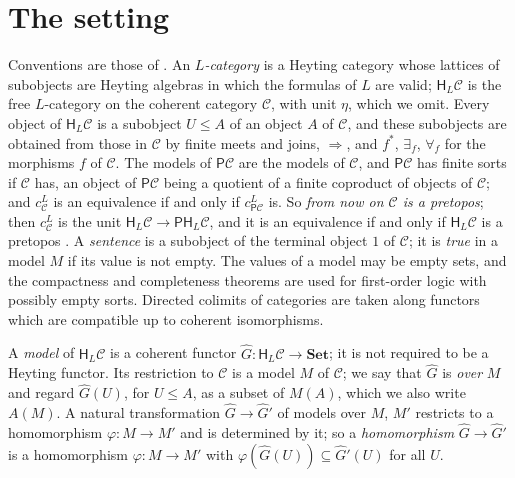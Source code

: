 \documentclass[11pt]{amsart}
\theoremstyle{definition}
\newcommand{\Set}{\mathbf{Set}}
\newcommand{\PP}{\mathsf P}
\newcommand{\HH}{\mathsf H}
\newcommand{\cC}{\mathcal C}
\begin{document}
\section{The setting}\label{sec:setting}

Conventions are those of \cite{Interm}. An \emph{$L$-category} is a
Heyting category whose lattices of subobjects are Heyting algebras in
which the formulas of $L$ are valid; $\HH_L\cC$ is the free
$L$-category on the coherent category $\cC$, with unit $\eta$, which
we omit. Every object of $\HH_L\cC$ is a subobject $U\le A$ of an
object $A$ of $\cC$, and these subobjects are obtained from those in
$\cC$ by finite meets and joins, $\Rightarrow$, and $f^*$, $\exists_f$,
$\forall_f$ for the morphisms $f$ of $\cC$. The models of $\PP\cC$ are
the models of $\cC$, and $\PP\cC$ has finite sorts if $\cC$ has, an
object of $\PP\cC$ being a quotient of a finite coproduct of objects
of $\cC$; and $c^L_\cC$ is an equivalence if and only if $c^L_{\PP\cC}$
is. So \emph{from now on $\cC$ is a pretopos}; then $c^L_\cC$ is the
unit $\HH_L\cC\to\PP\HH_L\cC$, and it is an equivalence if and only if
$\HH_L\cC$ is a pretopos \cite[Lemma~2.2]{Interm}. A \emph{sentence}
is a subobject of the terminal object $1$ of $\cC$; it is \emph{true}
in a model $M$ if its value is not empty. The values of a model may be
empty sets, and the compactness and completeness theorems are used for
first-order logic with possibly empty sorts. Directed colimits of
categories are taken along functors which are compatible up to
coherent isomorphisms.

A \emph{model} of $\HH_L\cC$ is a coherent functor $\hat G\colon
\HH_L\cC\to\Set$; it is not required to be a Heyting functor. Its
restriction to $\cC$ is a model $M$ of $\cC$; we say that $\hat G$ is
\emph{over} $M$ and regard $\hat G(U)$, for $U\le A$, as a subset of
$M(A)$, which we also write $A(M)$. A natural transformation $\hat G\to
\hat G'$ of models over $M$, $M'$ restricts to a homomorphism
$\varphi\colon M\to M'$ and is determined by it; so a
\emph{homomorphism} $\hat G\to\hat G'$ is a homomorphism $\varphi\colon
M\to M'$ with $\varphi(\hat G(U))\subseteq\hat G'(U)$ for all $U$.
\end{document}
